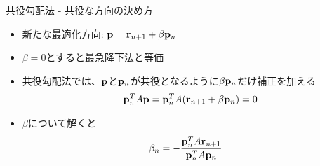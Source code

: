 \begin{frame}[t,fragile]{共役勾配法 - 共役な方向の決め方}
  \begin{itemize}
    \setlength{\itemsep}{1em}
  \item 新たな最適化方向: ${\bf p} = {\bf r}_{n+1} + \beta {\bf p}_n$
  \item $\beta=0$とすると最急降下法と等価
  \item 共役勾配法では、${\bf p}$と${\bf p}_{n}$が共役となるように$\beta {\bf p}_n$だけ補正を加える
    \begin{align*}
      {\bf p}_n^T A {\bf p} = {\bf p}_n^T A ({\bf r}_{n+1} + \beta {\bf p}_n) = 0
    \end{align*}
  \item $\beta$について解くと
    \begin{align*}
      \beta_n &= - \frac{{\bf p}_{n}^T A {\bf r}_{n+1}}{{\bf p}_n^T A {\bf p}_n}
    \end{align*}
  \end{itemize}
\end{frame}

